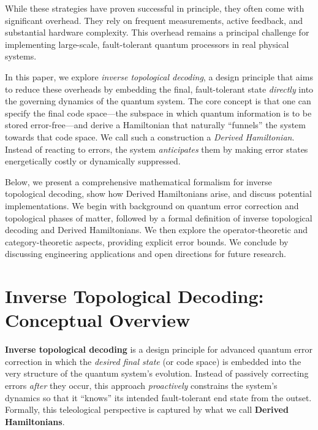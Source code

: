 \documentclass[11pt]{article}
\begin{document}
While these strategies have proven successful in principle, they often come with significant overhead. They rely on frequent measurements, active feedback, and substantial hardware complexity. This overhead remains a principal challenge for implementing large-scale, fault-tolerant quantum processors in real physical systems.

In this paper, we explore \emph{inverse topological decoding}, a design principle that aims to reduce these overheads by embedding the final, fault-tolerant state \emph{directly} into the governing dynamics of the quantum system. The core concept is that one can specify the final code space---the subspace in which quantum information is to be stored error-free---and derive a Hamiltonian that naturally ``funnels'' the system towards that code space. We call such a construction a \emph{Derived Hamiltonian}. Instead of reacting to errors, the system \emph{anticipates} them by making error states energetically costly or dynamically suppressed.

Below, we present a comprehensive mathematical formalism for inverse topological decoding, show how Derived Hamiltonians arise, and discuss potential implementations. We begin with background on quantum error correction and topological phases of matter, followed by a formal definition of inverse topological decoding and Derived Hamiltonians. We then explore the operator-theoretic and category-theoretic aspects, providing explicit error bounds. We conclude by discussing engineering applications and open directions for future research.

\section{Inverse Topological Decoding: Conceptual Overview}
\label{sec:inverse-topological-decoding}

\textbf{Inverse topological decoding} is a design principle for advanced quantum error correction in which the \emph{desired final state} (or code space) is embedded into the very structure of the quantum system’s evolution. Instead of passively correcting errors \emph{after} they occur, this approach \emph{proactively} constrains the system’s dynamics so that it “knows” its intended fault-tolerant end state from the outset. Formally, this teleological perspective is captured by what we call \textbf{Derived Hamiltonians}.
\end{document}
